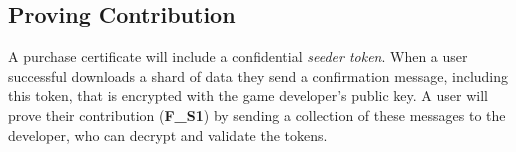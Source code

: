 \subsection*{Proving Contribution}

A purchase certificate will include a confidential \textit{seeder token}. When a user successful downloads a shard of data they send a confirmation message, including this token, that is encrypted with the game developer's public key. A user will prove their contribution (\textbf{F\_S1}) by sending a collection of these messages to the developer, who can decrypt and validate the tokens.
